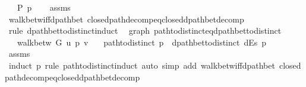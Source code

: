 \begin{isabellebody}
\ \ \ {\isachardoublequoteopen}P\ p{\isachardoublequoteclose}%
\endisataginvisible
{\isafoldinvisible}%
%
\isadeliminvisible
\isanewline
%
\endisadeliminvisible
%
\isadelimproof
\ \ %
\endisadelimproof
%
\isatagproof
{}\isamarkupfalse%
\ assms\isanewline
\ \ \isamarkupfalse%
\ walk{\isacharunderscore}{\kern0pt}betw{\isacharunderscore}{\kern0pt}iff{\isacharunderscore}{\kern0pt}dpath{\isacharunderscore}{\kern0pt}bet\ closed{\isacharunderscore}{\kern0pt}path{\isacharunderscore}{\kern0pt}decomp{\isacharunderscore}{\kern0pt}eq{\isacharunderscore}{\kern0pt}closed{\isacharunderscore}{\kern0pt}dpath{\isacharunderscore}{\kern0pt}bet{\isacharunderscore}{\kern0pt}decomp\isanewline
\ \ \isamarkupfalse%
\ {\isacharparenleft}{\kern0pt}rule\ dpath{\isacharunderscore}{\kern0pt}bet{\isacharunderscore}{\kern0pt}to{\isacharunderscore}{\kern0pt}distinct{\isacharunderscore}{\kern0pt}induct{\isacharparenright}{\kern0pt}%
\endisatagproof
{\isafoldproof}%
%
\isadelimproof
\isanewline
%
\endisadelimproof
%
\isadeliminvisible
\isanewline
%
\endisadeliminvisible
%
\isataginvisible
{}\isamarkupfalse%
\ {\isacharparenleft}{\kern0pt}\ graph{\isacharparenright}{\kern0pt}\ path{\isacharunderscore}{\kern0pt}to{\isacharunderscore}{\kern0pt}distinct{\isacharunderscore}{\kern0pt}eq{\isacharunderscore}{\kern0pt}dpath{\isacharunderscore}{\kern0pt}bet{\isacharunderscore}{\kern0pt}to{\isacharunderscore}{\kern0pt}distinct{\isacharcolon}{\kern0pt}\isanewline
\ \ \ {\isachardoublequoteopen}walk{\isacharunderscore}{\kern0pt}betw\ G\ u\ p\ v{\isachardoublequoteclose}\isanewline
\ \ \ {\isachardoublequoteopen}path{\isacharunderscore}{\kern0pt}to{\isacharunderscore}{\kern0pt}distinct\ p\ {\isacharequal}{\kern0pt}\ dpath{\isacharunderscore}{\kern0pt}bet{\isacharunderscore}{\kern0pt}to{\isacharunderscore}{\kern0pt}distinct\ dEs\ p{\isachardoublequoteclose}%
\endisataginvisible
{\isafoldinvisible}%
%
\isadeliminvisible
\isanewline
%
\endisadeliminvisible
%
\isadelimproof
\ \ %
\endisadelimproof
%
\isatagproof
{}\isamarkupfalse%
\ assms\isanewline
\ \ \isamarkupfalse%
\ {\isacharparenleft}{\kern0pt}induct\ p\ rule{\isacharcolon}{\kern0pt}\ path{\isacharunderscore}{\kern0pt}to{\isacharunderscore}{\kern0pt}distinct{\isacharunderscore}{\kern0pt}induct{\isacharparenright}{\kern0pt}\ {\isacharparenleft}{\kern0pt}auto\ simp\ add{\isacharcolon}{\kern0pt}\ walk{\isacharunderscore}{\kern0pt}betw{\isacharunderscore}{\kern0pt}iff{\isacharunderscore}{\kern0pt}dpath{\isacharunderscore}{\kern0pt}bet\ closed{\isacharunderscore}{\kern0pt}path{\isacharunderscore}{\kern0pt}decomp{\isacharunderscore}{\kern0pt}eq{\isacharunderscore}{\kern0pt}closed{\isacharunderscore}{\kern0pt}dpath{\isacharunderscore}{\kern0pt}bet{\isacharunderscore}{\kern0pt}decomp{\isacharparenright}{\kern0pt}%

\end{isabellebody}
